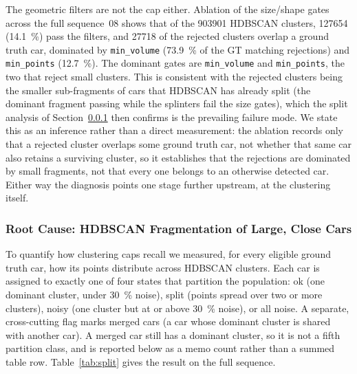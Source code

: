 \documentclass[a4paper,12pt]{report}
\begin{document}
The geometric filters are not the cap either. Ablation of the
size/shape gates across the full sequence~08 shows that of the
\num{903901} HDBSCAN clusters, \num{127654} (\SI{14.1}{\percent})
pass the filters, and \num{27718} of the rejected clusters overlap a ground truth
car, dominated by \texttt{min\_volume} (\SI{73.9}{\percent} of the GT matching
rejections) and \texttt{min\_points} (\SI{12.7}{\percent}). The dominant gates are
\texttt{min\_volume} and \texttt{min\_points}, the two that reject small
clusters. This is consistent with the rejected clusters being the smaller
sub-fragments of cars that HDBSCAN has already split (the dominant fragment passing
while the splinters fail the size gates), which the split analysis of
Section~\ref{sec:split-analysis} then confirms is the prevailing failure mode. We
state this as an inference rather than a direct measurement: the ablation records
only that a rejected cluster overlaps some ground truth car,
not whether that same car also retains a
surviving cluster, so it establishes that the rejections are dominated by small
fragments, not that every one belongs to an otherwise detected car. Either way the
diagnosis points one stage further upstream, at the clustering itself.

\subsubsection{Root Cause: HDBSCAN Fragmentation of Large, Close Cars}
\label{sec:split-analysis}

To quantify how clustering caps recall we measured, for every eligible ground truth
car, how its points distribute across HDBSCAN clusters. Each car is
assigned to exactly one of four states that partition the population: ok (one
dominant cluster, under \SI{30}{\percent} noise), split (points spread over
two or more clusters), noisy (one cluster but at or above \SI{30}{\percent}
noise), or all noise. A separate, cross-cutting flag marks merged cars
(a car whose dominant cluster is shared with another car). A merged car still has a
dominant cluster, so it is not a fifth partition class, and is reported below
as a memo count rather than a summed table row.
Table~\ref{tab:split} gives the result on the full sequence.
\end{document}
